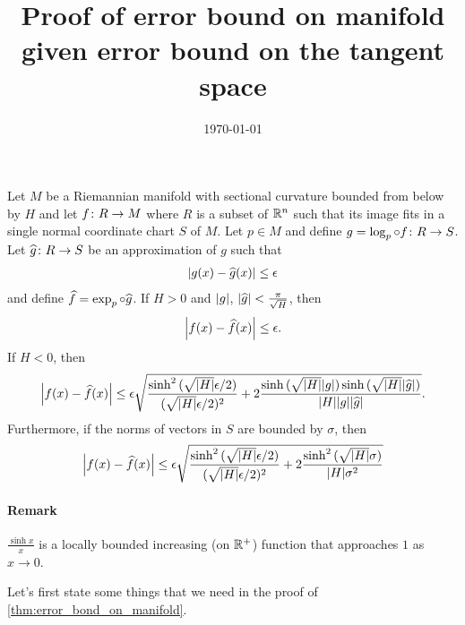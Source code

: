 \documentclass[english, a4paper, 12pt]{article}
\title{Proof of error bound on manifold given error bound on the tangent space}
\author{}
\date{\today}
\begin{document}
\maketitle

\begin{theorem}\label{thm:error_bond_on_manifold}
	Let $M$ be a Riemannian manifold with sectional curvature bounded from below by $H$ and let $f \colon R \to M$ where $R$ is a subset of $\mathbb{R}^n$ such that its image fits in a single normal coordinate chart $S$ of $M$.
	Let $p \in M$ and define $g = \operatorname{log}_p \circ f \colon R \to S$.
	Let $\widehat{g} \colon R \to S$ be an approximation of $g$ such that
	\begin{align}
		\abs{g(x) - \widehat{g}(x)} \leq \epsilon
	\end{align}
	and define $\widehat{f} = \operatorname{exp}_p \circ \widehat{g}$.
	If $H > 0$ and $\abs{g}$, $\abs{\widehat{g}} < \frac{\pi}{\sqrt{H}}$, then
	\begin{align}
		\abs{f(x) - \widehat{f}(x)} \leq \epsilon.
	\end{align}
	If $H < 0$, then
	\begin{align}
		\abs{f(x) - \widehat{f}(x)} \leq \epsilon \sqrt{
			\frac{\sinh^2{(\sqrt{\abs{H}} \epsilon / 2)}}{(\sqrt{\abs{H}} \epsilon / 2)^2}
			+ 2 \frac{\sinh{(\sqrt{\abs{H}} \abs{g})} \sinh{(\sqrt{\abs{H}} \abs{\widehat{g}})}}{\abs{H}  \abs{g} \abs{\widehat{g}}}
			}.
	\end{align}
	Furthermore, if the norms of vectors in $S$ are bounded by $\sigma$, then
	\begin{align}
		\abs{f(x) - \widehat{f}(x)} \leq \epsilon \sqrt{
			\frac{\sinh^2{(\sqrt{\abs{H}} \epsilon / 2)}}{(\sqrt{\abs{H}} \epsilon / 2)^2}
			+ 2 \frac{\sinh^2{(\sqrt{\abs{H}} \sigma)}}{\abs{H} \sigma^2}
			}
	\end{align}
\end{theorem}

\paragraph{Remark} 
$\frac{\sinh{x}}{x}$ is a locally bounded increasing (on $\mathbb{R}^+$) function that approaches $1$ as $x \to 0$.

\bigskip
Let's first state some things that we need in the proof of \cref{thm:error_bond_on_manifold}.
\end{document}
